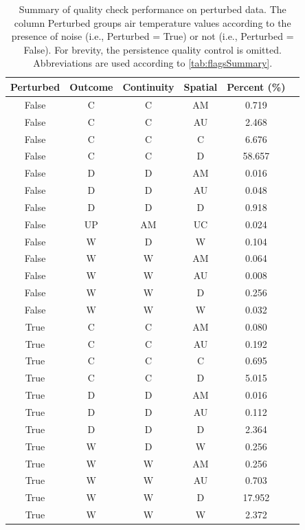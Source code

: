 \documentclass[authoryear,preprint,review,12pt]{elsarticle}
\begin{document}
\begin{table}[]
\centering
\begin{scriptsize}
    \begin{tabular}{cccccc}
        \toprule
        Perturbed & Outcome & Continuity & Spatial & Percent (\%) \\
        \midrule
        False & C  & C  & AM & 0.719  \\
        False & C  & C  & AU & 2.468  \\
        False & C  & C  & C  & 6.676  \\
        False & C  & C  & D  & 58.657 \\
        False & D  & D  & AM & 0.016  \\
        False & D  & D  & AU & 0.048  \\
        False & D  & D  & D  & 0.918  \\
        False & UP & AM & UC & 0.024  \\
        False & W  & D  & W  & 0.104  \\
        False & W  & W  & AM & 0.064  \\
        False & W  & W  & AU & 0.008  \\
        False & W  & W  & D  & 0.256  \\
        False & W  & W  & W  & 0.032  \\
        True  & C  & C  & AM & 0.080  \\
        True  & C  & C  & AU & 0.192  \\
        True  & C  & C  & C  & 0.695  \\
        True  & C  & C  & D  & 5.015  \\
        True  & D  & D  & AM & 0.016  \\
        True  & D  & D  & AU & 0.112  \\
        True  & D  & D  & D  & 2.364  \\
        True  & W  & D  & W  & 0.256  \\
        True  & W  & W  & AM & 0.256  \\
        True  & W  & W  & AU & 0.703  \\
        True  & W  & W  & D  & 17.952 \\
        True  & W  & W  & W  & 2.372  \\
        \bottomrule
    \end{tabular}
\end{scriptsize}
\caption{   Summary of quality check performance on perturbed data. 
            The column Perturbed groups air temperature values according to the presence of noise (i.e., Perturbed = True) or not (i.e., Perturbed = False).
            For brevity, the persistence quality control is omitted. 
            Abbreviations are used according to \cref{tab:flagsSummary}.}
\label{tab:validation_outcomes}
\end{table}
\end{document}
